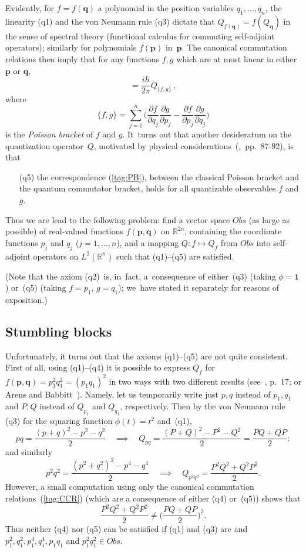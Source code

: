 \documentclass[11pt]{amsart}
\numberwithin{equation}{section}
\theoremstyle{remark}
\let\boldkey\mathbf \let\bold\mathbf
\newcommand\jedna{{\boldkey1}}
\newcommand\Obs{Obs}
\newcommand\RR{\mathbb R}
\newcommand{\bp}{\mathbf p}
\newcommand{\bq}{\mathbf q}
\begin{document}
Evidently, for $f=f(\bq)$ a polynomial in the position variables
$q_1,\dots,q_n$, the linearity (q1) and the von Neumann rule (q3) dictate that
$Q_{f(\bq)}=f(Q_\bq)$ in the sense of spectral theory (functional calculus for
commuting self-adjoint operators); similarly for polynomials $f(\bp)$ in~$\bp$.
The canonical commutation relations then imply that for any functions $f,g$
which are at most linear in either $\bp$ or $\bq$,
\begin{equation}  [Q_f,Q_g] = \frac{ih}{2\pi} Q_{\{f,g\}} \, ,  \label{tag:PB}
\end{equation}
where
\begin{equation}  \{f,g\} = \sum_{j=1}^n \bigg( \frac{\partial f}{\partial q_j}
\frac{\partial g}{\partial p_j} -\frac{\partial f}{\partial p_j}
\frac{\partial g}{\partial q_j} \bigg)   \label{tag:POAB}   \end{equation}
is the {\sl Poisson bracket\/} of $f$ and $g$. It~turns out that another
desideratum on the quantization operator~$Q$, motivated by physical
considerations~(\cite{bib:Dirac},~pp.~87-92), is that
\begin{enumerate}
\item[(q5)] the correspondence (\ref{tag:PB}), between the classical Poisson
bracket and the quantum commutator bracket,  holds for all quantizable
observables $f$ and $g$.
\end{enumerate}
Thus we are lead to the following problem: find a vector space $\Obs$ (as large
as possible) of real-valued functions $f(\bp,\bq)$ on $\RR^{2n}$, containing
the coordinate functions $p_j$ and $q_j$ ($j=1,\dots,n$), and a mapping
$Q:f\mapsto Q_f$ from $\Obs$ into self-adjoint operators on $L^2(\RR^n)$ such
that (q1)--(q5) are satisfied.

(Note that the axiom (q2)~is, in~fact, a~consequence of either~(q3) (taking
$\phi=\jedna$) or~(q5) (taking $f=p_1$, $g=q_1$); we~have stated it separately
for reasons of exposition.)

\subsection{Stumbling blocks}

Unfortunately, it turns out that the axioms (q1)--(q5) are not quite
consistent. First of all, using (q1)--(q4) it is possible to express $Q_f$ for
$f(\bp,\bq)=p_1^2 q_1^2=(p_1 q_1)^2$ in two ways with two different results
(see~\cite{bib:Foll}, p.~17; or Arens and Babbitt~\cite{bib:ArensB}). Namely,
let us temporarily write just $p,q$ instead of $p_1,q_1$ and $P,Q$ instead of
$Q_{p_1}$ and $Q_{q_1}$, respectively. Then by the von Neumann rule (q3) for
the squaring function $\phi(t)=t^2$ and~(q1),
$$ pq = \frac{(p+q)^2-p^2-q^2}2 \quad \implies \quad
Q_{pq} = \frac{(P+Q)^2-P^2-Q^2}2=\frac{PQ+QP}2;  $$
and similarly
$$ p^2 q^2 = \frac{(p^2+q^2)^2-p^4-q^4}2 \quad \implies \quad
Q_{p^2 q^2} = \frac{P^2 Q^2+Q^2 P^2}2 .  $$
However, a small computation using only the canonical commutation
relations~(\ref{tag:CCR}) (which are a consequence of either (q4) or~(q5))
shows that
$$ \frac{P^2 Q^2+Q^2 P^2}2 \neq \bigg(\frac{PQ+QP}2\bigg)^2.   $$
Thus neither (q4) nor (q5) can be satisfied if (q1) and (q3) are and $p_1^2,
q_1^2,p_1^4,q_1^4,p_1 q_1$ and $p_1^2 q_1^2\in\Obs$.
\end{document}
